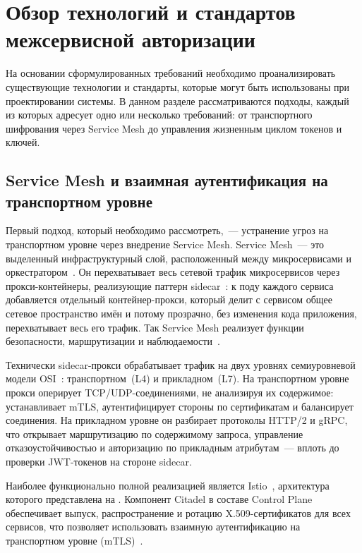 \section{Обзор технологий и стандартов межсервисной авторизации}\label{sec:tech-review}

На основании сформулированных требований
необходимо проанализировать существующие технологии и стандарты,
которые могут быть использованы при проектировании системы.
В данном разделе рассматриваются подходы,
каждый из которых адресует одно или несколько требований:
от транспортного шифрования через Service Mesh
до управления жизненным циклом токенов и ключей.

\subsection{Service Mesh и взаимная аутентификация на транспортном уровне}\label{subsec:service-mesh}

Первый подход, который необходимо рассмотреть,~---
устранение угроз на транспортном уровне через внедрение Service Mesh.
Service Mesh~--- это выделенный инфраструктурный слой,
расположенный между микросервисами и оркестратором~\cite{Koschel2021}.
Он перехватывает весь сетевой трафик микросервисов
через прокси-контейнеры, реализующие паттерн sidecar~\cite{KubernetesSidecar}:
к поду каждого сервиса добавляется отдельный контейнер-прокси,
который делит с сервисом общее сетевое пространство имён
и потому прозрачно, без изменения кода приложения, перехватывает весь его трафик.
Так Service Mesh реализует функции безопасности, маршрутизации и наблюдаемости~\cite{Li2019}.

Технически sidecar-прокси обрабатывает трафик на двух уровнях
семиуровневой модели OSI~\cite{ISO7498}:
транспортном~(L4) и прикладном~(L7).
На транспортном уровне прокси оперирует TCP/UDP-соединениями,
не анализируя их содержимое: устанавливает mTLS,
аутентифицирует стороны по сертификатам и балансирует соединения.
На прикладном уровне он разбирает протоколы HTTP/2 и gRPC,
что открывает маршрутизацию по содержимому запроса,
управление отказоустойчивостью и авторизацию по прикладным атрибутам~---
вплоть до проверки JWT-токенов на стороне sidecar.

Наиболее функционально полной реализацией является Istio~\cite{Koschel2021},
архитектура которого представлена на .
Компонент Citadel в составе Control Plane обеспечивает выпуск, распространение и ротацию
X.509-сертификатов для всех сервисов,
что позволяет использовать взаимную аутентификацию на транспортном уровне (mTLS)~\cite{PlatformV2025}.

